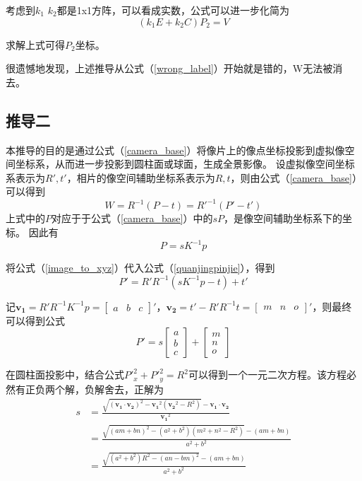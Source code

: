 \documentclass{ctexart}
\renewcommand{\vec}[1]{\boldsymbol{#1}} %
\begin{document}
	考虑到$k_1$ $k_2$都是1x1方阵，可以看成实数，公式可以进一步化简为
	\begin{equation}
	(k_1 E + k_2 C ) P_2 = V
	\end{equation}	
	
	求解上式可得$P_2$坐标。
	
	很遗憾地发现，上述推导从公式（\ref{wrong_label}）开始就是错的，W无法被消去。
	
	\subsection{推导二}
	本推导的目的是通过公式（\ref{camera_base}）将像片上的像点坐标投影到虚拟像空间坐标系，从而进一步投影到圆柱面或球面，生成全景影像。
	设虚拟像空间坐标系表示为$R',t'$，相片的像空间辅助坐标系表示为$R, t$，则由公式（\ref{camera_base}）可以得到
	\begin{equation}
	W = R^{-1} (P - t) = R'^{-1} (P' - t') \label{quanjingpinjie}
	\end{equation}
	上式中的$P$对应于于公式（\ref{camera_base}）中的$sP$，是像空间辅助坐标系下的坐标。
	因此有
	\begin{equation}
	P = s K^{-1} p \label{image_to_xyz}
	\end{equation}
		
	将公式（\ref{image_to_xyz}）代入公式（\ref{quanjingpinjie}），得到
	\begin{equation}
	P' = R' R^{-1} (s K^{-1} p - t) + t'
	\end{equation}
	
	记$\vec{v_1} = R' R^{-1} K^{-1} p = \begin{bmatrix}
	a & b & c
	\end{bmatrix}' $，$\vec{v_2} = t' - R' R^{-1} t = \begin{bmatrix}
	m & n & o
	\end{bmatrix}'$，则最终可以得到公式
	\begin{equation} \label{get_P_}
	P' = s
	\begin{bmatrix}
	a \\ b \\ c
	\end{bmatrix}
	+
	\begin{bmatrix}
	m \\ n \\ o
	\end{bmatrix}	
	\end{equation}
	
	在圆柱面投影中，结合公式${P'}_x^2 + {P'}_y^2 = R^2$可以得到一个一元二次方程。该方程必然有正负两个解，负解舍去，正解为
	\begin{equation}
	\begin{split}
	s
	&= \frac{\sqrt{(\vec{v_1}\cdot\vec{v_2})^2 - \vec{v_1}^2(\vec{v_2}^2-R^2)} - \vec{v_1}\cdot\vec{v_2}}{\vec{v_1}^2} \\
	&= \frac{\sqrt{(am+bn)^2-(a^2+b^2)(m^2+n^2-R^2)}-(am+bn)}{a^2+b^2} \\
	&= \frac{\sqrt{(a^2+b^2)R^2 - (an-bm)^2}-(am+bn)}{a^2+b^2}
	\end{split}
	\end{equation}
	
\end{document}
